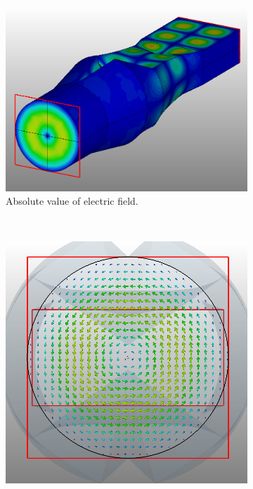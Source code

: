 \documentclass[english,twoside]{article}
\begin{document}
		\begin{landscape}
			\begin{figure}
				\centering
				\begin{subfigure}[b]{0.6\textwidth}
					\includegraphics[width=\textwidth]{figures/wrTE20ToWcTE01_abs}
					\caption{Absolute value of electric field.}
				\end{subfigure}
				~
				\begin{subfigure}[b]{0.45\textwidth}
					\includegraphics[width=\textwidth]{figures/wrTE20ToWcTE01_output}

\end{subfigure}
\end{figure}
\end{landscape}
\end{document}
